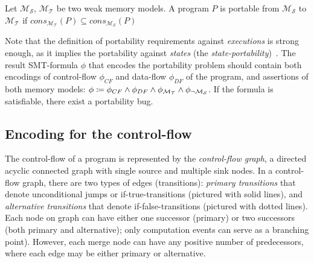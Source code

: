\begin{definition}[Portability]
Let $\mathcal{M_S}$, $\mathcal{M_T}$ be two weak memory models. A program $P$ is portable from $\mathcal{M_S}$ to $\mathcal{M_T}$ if 
$\textit{cons}_{\mathcal{M_T}}(P) \subseteq \textit{cons}_{\mathcal{M_S}}(P)$
\end{definition}

Note that the definition of portability requirements against \textit{executions} is strong enough, as it implies the portability against \textit{states} (the \textit{state-portability})~\cite{Porthos17b}.
The result SMT-formula $\phi$ that encodes the portability problem should contain both encodings of control-flow $\phi_{CF}$ and data-flow $\phi_{DF}$ of the program, and assertions of both memory models: ${\phi \coloneqq \phi_{CF} \land \phi_{DF} \land \phi_{\mathcal{M_T}} \land \phi_{\lnot\mathcal{M_S}}}$. If the formula is satisfiable, there exist a portability bug.


\subsection{Encoding for the control-flow} %
\label{ch:enc:enc:cf}

The control-flow of a program is represented by the \textit{control-flow graph}, a directed acyclic connected graph with single source and multiple sink nodes. %
In a control-flow graph, there are two types of edges (transitions): \textit{primary transitions} that denote unconditional jumps or if-true-transitions (pictured with solid lines), and \textit{alternative transitions} that denote if-false-transitions (pictured with dotted lines).
Each node on graph can have either one successor (primary) or two successors (both primary and alternative); only computation events can serve as a branching point).
However, each merge node can have any positive number of predecessors, where each edge may be either primary or alternative.

